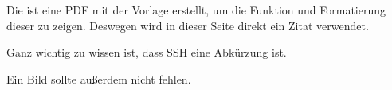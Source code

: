 Die ist eine PDF mit der Vorlage erstellt, um die Funktion und Formatierung dieser zu zeigen.
Deswegen wird in dieser Seite direkt ein Zitat verwendet.

Ganz wichtig zu wissen ist, dass \ac*{SSH} eine Abkürzung ist.

Ein Bild sollte außerdem nicht fehlen.
\newpage
